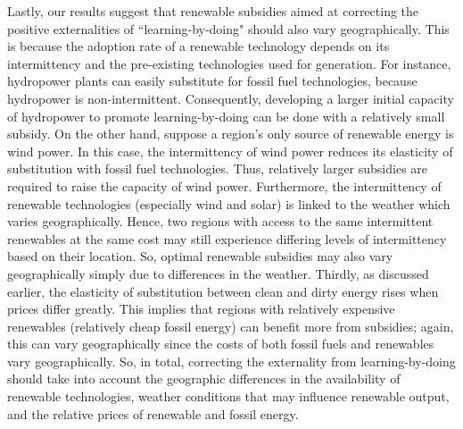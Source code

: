 \documentclass[11pt,a4paper,leqno]{extarticle}
\begin{document}
	Lastly, our results suggest that renewable subsidies aimed at correcting the positive externalities of ``learning-by-doing" should also vary geographically. This is because the adoption rate of a renewable technology depends on its intermittency and the pre-existing technologies used for generation. For instance, hydropower plants can easily substitute for fossil fuel technologies, because hydropower is non-intermittent. Consequently, developing a larger initial capacity of hydropower to promote learning-by-doing can be done with a relatively small subsidy. On the other hand, suppose a region's only source of renewable energy is wind power. In this case, the intermittency of wind power reduces its elasticity of substitution with fossil fuel technologies. Thus, relatively larger subsidies are required to raise the capacity of wind power. Furthermore, the intermittency of renewable technologies (especially wind and solar) is linked to the weather which varies geographically. Hence, two regions with access to the same intermittent renewables at the same cost may still experience differing levels of intermittency based on their location. So, optimal renewable subsidies may also vary geographically simply due to differences in the weather. Thirdly, as discussed earlier, the elasticity of substitution between clean and dirty energy rises when prices differ greatly. This implies that regions with relatively expensive renewables (relatively cheap fossil energy) can benefit more from subsidies; again, this can vary geographically since the costs of both fossil fuels and renewables vary geographically. So, in total, correcting the externality from learning-by-doing should take into account the geographic differences in the availability of renewable technologies, weather conditions that may influence renewable output, and the relative prices of renewable and fossil energy. 
	
\end{document}
